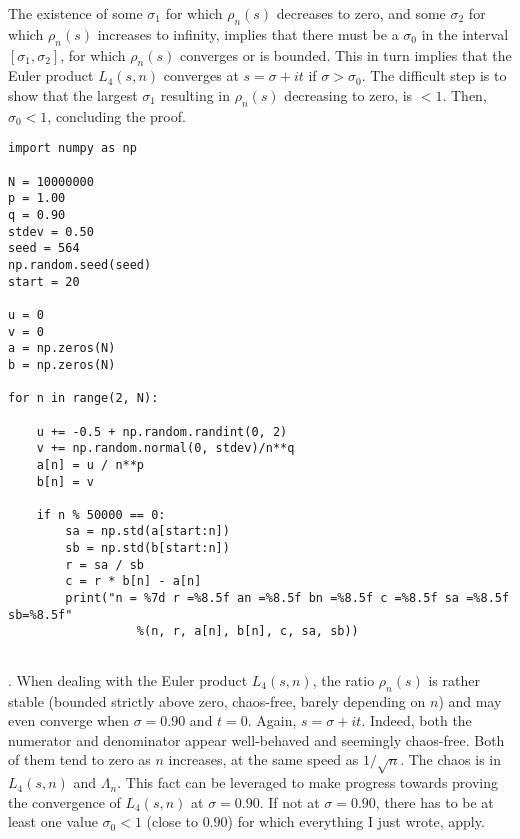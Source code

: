 \documentclass[oneside,10pt]{book}
\begin{document}
The existence of some $\sigma_1$ for which $\rho_n(s)$ decreases to zero, 
  and some $\sigma_2$ for which $\rho_n(s)$ increases to infinity, implies that there must be 
 a $\sigma_0$ in the interval $[\sigma_1, \sigma_2]$,  for which $\rho_n(s)$ converges or is bounded. This in turn implies that the 
 Euler product $L_4(s, n)$ converges at $s=\sigma+it$ if $\sigma > \sigma_0$. The difficult step is to show that 
 the largest $\sigma_1$
  resulting in $\rho_n(s)$ decreasing to zero, is $<1$. Then, $\sigma_0<1$, concluding the proof.
\vspace{1ex}

\begin{lstlisting}
import numpy as np

N = 10000000
p = 1.00 
q = 0.90  
stdev = 0.50
seed = 564
np.random.seed(seed)
start = 20

u = 0
v = 0
a = np.zeros(N)
b = np.zeros(N)

for n in range(2, N):

    u += -0.5 + np.random.randint(0, 2) 
    v += np.random.normal(0, stdev)/n**q  
    a[n] = u / n**p 
    b[n] = v

    if n % 50000 == 0:
        sa = np.std(a[start:n])
        sb = np.std(b[start:n])
        r = sa / sb
        c = r * b[n] - a[n]
        print("n = %7d r =%8.5f an =%8.5f bn =%8.5f c =%8.5f sa =%8.5f sb=%8.5f" 
                  %(n, r, a[n], b[n], c, sa, sb)) 
    
\end{lstlisting}
\vspace{1ex}






. When dealing with the Euler product $L_4(s, n)$, the ratio $\rho_n(s)$ is rather stable (bounded strictly above zero, chaos-free, barely depending on $n$) and may even converge when $\sigma=0.90$ and $t=0$. Again, $s=\sigma+it$. Indeed, both the numerator and denominator appear well-behaved and seemingly chaos-free. Both of them tend to zero  
 as $n$ increases, at the same speed as $1/\sqrt{n}$. The chaos is in $L_4(s,n)$ and $\Lambda_n$. This fact can be leveraged to make 
 progress towards proving the convergence of $L_4(s,n)$ at $\sigma=0.90$. If not at $\sigma =0.90$, there has to be at least one value $\sigma_0 <1$ (close to $0.90$) for which everything I just wrote, apply.
\end{document}
